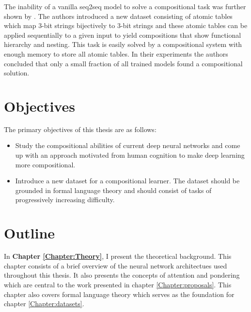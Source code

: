 The inability of a vanilla seq2seq model to solve a compositional task was further shown by \cite{Liska2018}. The authors introduced a new dataset consisting of atomic tables which map 3-bit strings bijectively to 3-bit strings and these atomic tables can be applied sequentially to a given input to yield compositions that show functional hierarchy and nesting. This task is easily solved by a compositional system with enough memory to store all atomic tables. In their experiments the authors concluded that only a small fraction of all trained models found a compositional solution.


		
\section{Objectives}
	The primary objectives of this thesis are as follows:
	\begin{itemize}
		\item Study the compositional abilities of current deep neural networks and come up with an approach motivated from human cognition to make deep learning more compositional.
		\item Introduce a new dataset for a compositional learner. The dataset should be grounded in formal language theory and should consist of tasks of progressively increasing difficulty.
	\end{itemize}

	
\section{Outline}
	In \textbf{Chapter \ref{Chapter:Theory}}, I present the theoretical background. This chapter consists of a brief overview of the neural network architectues used throughout this thesis. It also presents the concepts of attention and pondering which are central to the work presented in chapter \ref{Chapter:proposals}. This chapter also covers formal language theory which serves as the foundation for chapter \ref{Chapter:datasets}.
	
